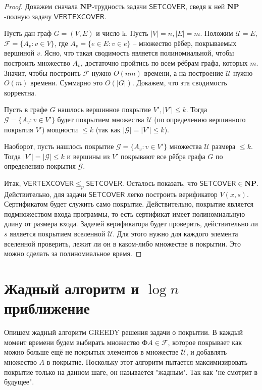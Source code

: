 \documentclass{article}
\begin{document}
\begin{proof}Докажем сначала $\mathbf{NP}$-трудность задачи $\mathsf{SETCOVER}$, сведя к ней $\mathbf{NP}$-полную задачу $\mathsf{VERTEXCOVER}$.

Пусть дан граф $G = (V, E)$ и число k. Пусть $|V| = n, |E| = m$. Положим $\mathcal{U} = E$, $\mathcal{F} = \{A_v : v \in V\}$, где $A_v = \{e \in E: v \in e\}$ -- множество рёбер, покрываемых вершиной $v$. Ясно, что такая  сводимость является полиномиальной, чтобы построить множество $A_v$, достаточно пройтись по всем рёбрам графа, которых $m$. Значит, чтобы построить $\mathcal{F}$ нужно $O(nm)$ времени, а на построение $\mathcal{U}$ нужно $O(m)$ времени. Суммарно это $O(|G|)$. Докажем, что эта сводимость корректна.

Пусть в графе $G$ нашлось вершинное покрытие $V', |V'| \leq k$. Тогда $\mathcal{G} = \{A_v: v \in V'\}$ будет покрытием множества $\mathcal{U}$ (по определению вершинного покрытия $V'$) мощности $\leq k$ (так как $|\mathcal{G}| = |V'| \leq k$).

Наоборот, пусть нашлось покрытие $\mathcal{G} = \{A_v: v \in V'\}$ множества $\mathcal{U}$ размера $\leq k$. Тогда $|V'| = |\mathcal{G}| \leq k$ и вершины из $V'$ покрывают все рёбра графа $G$ по определению покрытия $\mathcal{G}$.

Итак, $\mathsf{VERTEXCOVER} \leq_p \mathsf{SETCOVER}$. Осталось показать, что $\mathsf{SETCOVER} \in \mathbf{NP}$. Действительно, для задачи $\mathsf{SETCOVER}$ легко построить верификатор $V(x, s)$. Сертификатом будет служить само покрытие. Действительно, покрытие является подмножеством входа программы, то есть сертификат имеет полиномиальную длину от размера входа. Задачей верификатора будет проверить, действительно ли $s$ является покрытием вселенной $\mathcal{U}$. Для этого нужно для каждого элемента вселенной проверить, лежит ли он в каком-либо множестве в покрытии. Это можно сделать за полиномиальное время.
\end{proof}

\section*{Жадный алгоритм и $\log n$ приближение}
Опишем жадный алгоритм GREEDY решения задачи о покрытии. В каждый момент времени будем выбирать множество $Ф A \in \mathcal{F}$, которое покрывает как можно больше ещё не покрытых элементов в множестве $\mathcal{U}$, и добавлять множество $A$ в покрытие. Поскольку этот алгоритм пытается максимизировать покрытие только на данном шаге, он называется "жадным". Так как "не смотрит в будущее".
\end{document}
